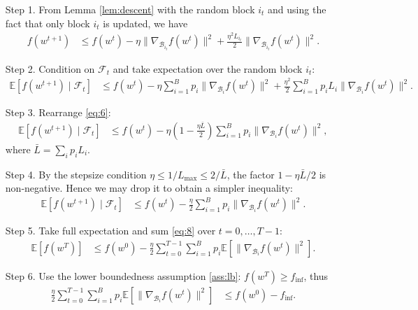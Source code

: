 \documentclass{article}
\newcommand{\E}{\mathbb{E}}
\begin{document}
\begin{enumerate}
\item[Step 1.]  From Lemma \ref{lem:descent} with the random block $i_{t}$
and using the fact that only block $i_{t}$ is updated, we have
\begin{align}
f(w^{t+1}) &\le f(w^{t})-\eta\|\nabla_{\mathcal{B}_{i_{t}}}f(w^{t})\|^{2}
               +\frac{\eta^{2}L_{i_{t}}}{2}
                 \|\nabla_{\mathcal{B}_{i_{t}}}f(w^{t})\|^{2}.
\tag{5}
\end{align}
\item[Step 2.]  Condition on $\mathcal{F}_{t}$ and take expectation over the
random block $i_{t}$:
\begin{align}
\E\!\left[f(w^{t+1})\mid\mathcal{F}_{t}\right]
&\le f(w^{t})-\eta \sum_{i=1}^{B}p_{i}
      \|\nabla_{\mathcal{B}_{i}}f(w^{t})\|^{2}
   +\frac{\eta^{2}}{2}\sum_{i=1}^{B}p_{i}L_{i}
      \|\nabla_{\mathcal{B}_{i}}f(w^{t})\|^{2}.
\tag{6}
\end{align}
\item[Step 3.]  Rearrange \eqref{eq:6}:
\begin{align}
\E\!\left[f(w^{t+1})\mid\mathcal{F}_{t}\right]
&\le f(w^{t})-\eta\!\left(1-\frac{\eta\bar L}{2}\right)
      \sum_{i=1}^{B}p_{i}\|\nabla_{\mathcal{B}_{i}}f(w^{t})\|^{2},
\tag{7}
\end{align}
where $\bar L=\sum_{i}p_{i}L_{i}$.
\item[Step 4.]  By the stepsize condition $\eta\le 1/L_{\max}\le 2/\bar L$,
the factor $1-\eta\bar L/2$ is non‑negative.  Hence we may drop it
to obtain a simpler inequality:
\begin{align}
\E\!\left[f(w^{t+1})\mid\mathcal{F}_{t}\right]
&\le f(w^{t})-\frac{\eta}{2}
      \sum_{i=1}^{B}p_{i}\|\nabla_{\mathcal{B}_{i}}f(w^{t})\|^{2}.
\tag{8}
\end{align}
\item[Step 5.]  Take full expectation and sum \eqref{eq:8} over $t=0,\dots ,T-1$:
\begin{align}
\E\!\left[f(w^{T})\right]
&\le f(w^{0})-\frac{\eta}{2}
   \sum_{t=0}^{T-1}\sum_{i=1}^{B}p_{i}
   \E\!\left[\|\nabla_{\mathcal{B}_{i}}f(w^{t})\|^{2}\right].
\tag{9}
\end{align}
\item[Step 6.]  Use the lower boundedness assumption \ref{ass:lb}:
$f(w^{T})\ge f_{\inf}$, thus
\begin{align}
\frac{\eta}{2}
   \sum_{t=0}^{T-1}\sum_{i=1}^{B}p_{i}
   \E\!\left[\|\nabla_{\mathcal{B}_{i}}f(w^{t})\|^{2}\right]
&\le f(w^{0})-f_{\inf}.

\end{align}
\end{enumerate}
\end{document}
